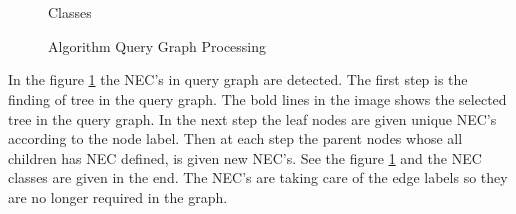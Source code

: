 \begin{figure}[h!]
\begin{minipage}{.3\textwidth}
\hfill \\
\\Classes
\end{minipage}
 \caption{Algorithm Query Graph Processing}
 \label{fig:working}
\end{figure}
 \par In the figure \ref{fig:working} the NEC's in query graph are detected. The first step is the finding of tree in the query graph. The bold lines in the image shows the selected tree in the query graph. In the next step the leaf nodes are given unique NEC's according to the node label. Then at each step the parent nodes whose all children has NEC defined, is given new NEC's. See the figure \ref{fig:working} and the NEC classes are given in the end. The NEC's are taking care of the edge labels so they are no longer required in the graph. 

